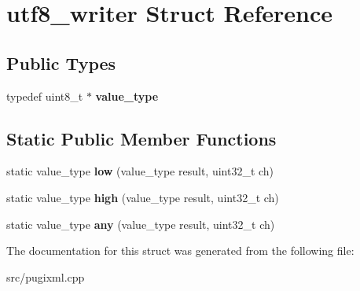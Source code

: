 \hypertarget{structutf8__writer}{}\section{utf8\+\_\+writer Struct Reference}
\label{structutf8__writer}
\subsection*{Public Types}
\begin{DoxyCompactItemize}
\item 
\mbox{\label{structutf8__writer_af25ec3c651f9a4a3f193573a4e95002b}} 
typedef uint8\+\_\+t $\ast$ {\bfseries value\+\_\+type}
\end{DoxyCompactItemize}
\subsection*{Static Public Member Functions}
\begin{DoxyCompactItemize}
\item 
\mbox{\label{structutf8__writer_ac4ec52da6f37225ba4fde259bff2f86c}} 
static value\+\_\+type {\bfseries low} (value\+\_\+type result, uint32\+\_\+t ch)
\item 
\mbox{\label{structutf8__writer_ac03dfaf797d599afdf0be7def86ff9b9}} 
static value\+\_\+type {\bfseries high} (value\+\_\+type result, uint32\+\_\+t ch)
\item 
\mbox{\label{structutf8__writer_a288e9c5f3720b95ae6b77330ad38dd56}} 
static value\+\_\+type {\bfseries any} (value\+\_\+type result, uint32\+\_\+t ch)
\end{DoxyCompactItemize}


The documentation for this struct was generated from the following file\+:\begin{DoxyCompactItemize}
\item 
src/pugixml.\+cpp\end{DoxyCompactItemize}
